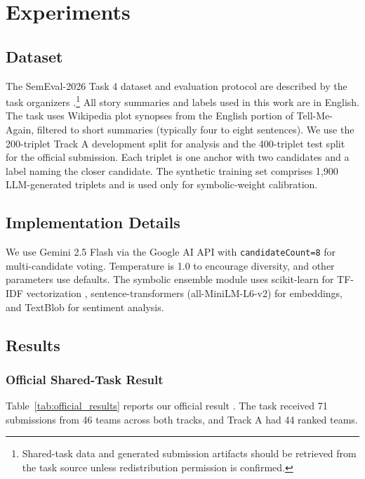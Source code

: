 \documentclass[11pt]{article}
\begin{document}
\section{Experiments}

\subsection{Dataset}

The SemEval-2026 Task 4 dataset and evaluation protocol are described by the task organizers \citep{hatzel-etal-2026-semeval,narrative-similarity-data-2026}.\footnote{Shared-task data and generated submission artifacts should be retrieved from the task source unless redistribution permission is confirmed.} All story summaries and labels used in this work are in English. The task uses Wikipedia plot synopses from the English portion of Tell-Me-Again, filtered to short summaries (typically four to eight sentences). We use the 200-triplet Track A development split for analysis and the 400-triplet test split for the official submission. Each triplet is one anchor with two candidates and a label naming the closer candidate. The synthetic training set comprises 1,900 LLM-generated triplets and is used only for symbolic-weight calibration.

\subsection{Implementation Details}

We use Gemini 2.5 Flash via the Google AI API with \texttt{candidateCount=8} for multi-candidate voting. Temperature is 1.0 to encourage diversity, and other parameters use defaults. The symbolic ensemble module uses scikit-learn for TF-IDF vectorization \citep{pedregosa2011scikit}, sentence-transformers (all-MiniLM-L6-v2) for embeddings, and TextBlob for sentiment analysis.

\subsection{Results}

\subsubsection{Official Shared-Task Result}
Table~\ref{tab:official_results} reports our official result \citep{narrative-similarity-results-2026}. The task received 71 submissions from 46 teams across both tracks, and Track A had 44 ranked teams.
\end{document}
